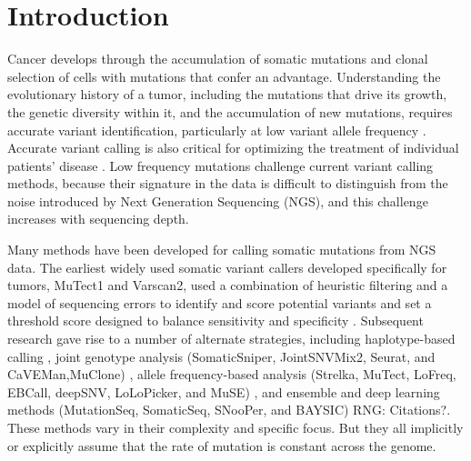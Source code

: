 \documentclass[a4,center,fleqn]{NAR}
\newcommand{\rngcomment}[1]{{\color{red}RNG: #1}}
\begin{document}
\section{Introduction}

Cancer develops through the accumulation of somatic mutations and clonal selection of cells with mutations that confer an advantage.
Understanding the evolutionary history of a tumor, including the mutations that drive its growth, the genetic diversity within it, and the accumulation of new mutations, requires accurate variant identification, particularly at low variant allele frequency \cite{Williams2016,Bozic2016,Williams2018,Shi2018}.
Accurate variant calling is also critical for optimizing the treatment of individual patients' disease \citep{Ding2012,Mardis2012,Chen2013,Borad2014,Findlay2016}.
Low frequency mutations challenge current variant calling methods, because their signature in the data is difficult to distinguish from the noise introduced by Next Generation Sequencing (NGS), and this challenge increases with sequencing depth.

Many methods have been developed for calling somatic mutations from NGS data.
The earliest widely used somatic variant callers developed specifically for tumors, MuTect1 and Varscan2, used a combination of heuristic filtering and a model of sequencing errors to identify and score potential variants and set a threshold score designed to balance sensitivity and specificity \citep{Koboldt2012,Cibulskis2013}.
Subsequent research gave rise to a number of alternate strategies, including haplotype-based calling \citep{Garrison2012},
joint genotype analysis (SomaticSniper, JointSNVMix2, Seurat, and CaVEMan,MuClone) \cite{Larson2012,Roth2012a,Christoforides2013,Jones2016,Dorri2019}, allele frequency-based analysis (Strelka, MuTect, LoFreq, EBCall, deepSNV, LoLoPicker, and MuSE) \citep{Saunders2012,Wilm2012,Shiraishi2013b,Gerstung2012,Carrot-Zhang2017,Fan2016}, and ensemble and deep learning methods (MutationSeq, SomaticSeq, SNooPer, and BAYSIC) \rngcomment{Citations?}.
These methods vary in their complexity and specific focus.
But they all implicitly or explicitly assume that the rate of mutation is constant across the genome.
\end{document}
